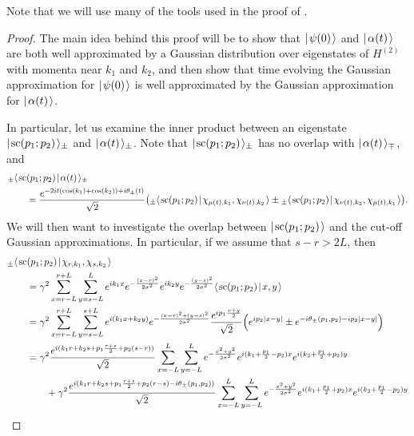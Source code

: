 \documentclass[../thesis-main/thesis-main]{subfiles}
\begin{document}
Note that we will use many of the tools used in the proof of .

\begin{proof}
The main idea behind this proof will be to show that $|\mspace{2mu} \psi(0) \mspace{2mu} \rangle$ and $|\mspace{2mu} \alpha (t) \mspace{2mu} \rangle$ are both well approximated by a Gaussian distribution over eigenstates of $H^{(2)}$ with momenta near $k_1$ and $k_2$, and then show that time evolving the Gaussian approximation for $|\mspace{2mu} \psi(0) \mspace{2mu} \rangle$ is well approximated by the Gaussian approximation for $|\mspace{2mu} \alpha(t) \mspace{2mu} \rangle$.  
  
In particular, let us examine the inner product between an eigenstate $|\mspace{2mu} \text{sc} (p_1;p_2) \mspace{2mu} \rangle_{\pm}$ and $|\mspace{2mu} \alpha(t) \mspace{2mu} \rangle_{\pm}$.  Note that $|\mspace{2mu} \text{sc}(p_1;p_2) \mspace{2mu} \rangle_{\pm}$ has no overlap with $|\mspace{2mu} \alpha(t) \mspace{2mu} \rangle_{\mp}$, and 
\begin{align}
  &{}_{\pm}\langle\mspace{2mu} \text{sc}(p_1;p_2) \mspace{2mu} | \mspace{2mu} \alpha(t)\mspace{2mu} \rangle_\pm \nonumber\\
  & \qquad= \frac{e^{-2 i  t (\cos(k_1) + \cos(k_2)) + i\theta_{\pm}(t)}}{\sqrt{2}} \big({}_{\pm}\langle\mspace{2mu} \text{sc} (p_1;p_2) \mspace{2mu} | \mspace{2mu} \chi_{\mu(t),k_1},\chi_{\nu(t),k_2}\mspace{2mu} \rangle  \pm {}_{\pm}\langle\mspace{2mu} \text{sc}(p_1;p_2) \mspace{2mu} | \mspace{2mu} \chi_{\nu(t),k_2},\chi_{\mu(t),k_1}\mspace{2mu} \rangle\big).
\end{align}
We will then want to investigate the overlap between $|\mspace{2mu} \text{sc}(p_1;p_2) \mspace{2mu} \rangle$ and the cut-off Gaussian approximations.  In particular, if we assume that $s - r > 2 L$, then 
\begin{align}
   &_{\pm}\braket{\scat(p_1;p_2)}{\chi_{r,k_1},\chi_{s,k_2}}\nonumber\\
    &\qquad= \gamma^2\sum_{x=r-L}^{r+L} \sum_{y=s-L}^{L} e^{ik_1x}e^{-\frac{(x-r)^2}{2\sigma^2}} e^{i k_2 y}e^{-\frac{(y-s)^2}{2\sigma^2}} \braket{\scat(p_1;p_2)}{x,y}\\
   &\qquad= \gamma^2\sum_{x=r-L}^{r+L} \sum_{y=s-L}^{s+L} e^{i (k_1 x + k_2 y)} e^{-\frac{(x-r)^2 + (y-s)^2}{2\sigma^2}} \frac{e^{i p_1 \frac{x+y}{2}}}{\sqrt{2}} \Big( e^{  i p_2 | x - y|} \pm e^{-i\theta_{\pm}(p_1,p_2) - i p_2 |x-y|}\Big)\\
   &\qquad = \gamma^2\frac{e^{i (k_1 r + k_2 s + p_1 \frac{r+s}{2} + p_2 (s - r))}}{\sqrt{2}} \sum_{x=-L}^{L} \sum_{y=-L}^L e^{ -\frac{ x^2 + y^2}{2\sigma^2}}e^{i ( k_1 + \frac{p_1}{2} -p_2) x} e^{i (k_2 + \frac{p_1}{2} + p_2)y} \nonumber\\
   &\qquad \qquad + \gamma^2 \frac{e^{i (k_1 r + k_2 s + p_1 \frac{r+s}{2} + p_2 (r-s) - i \theta_\pm(p_1,p_2))}}{\sqrt{2}} \sum_{x=-L}^{L} \sum_{y=-L}^L e^{ -\frac{ x^2 + y^2}{2\sigma^2}}e^{i ( k_1 + \frac{p_1}{2} +p_2) x} e^{i (k_2 + \frac{p_1}{2} - p_2)y}\\

\end{align}
\end{proof}
\end{document}
